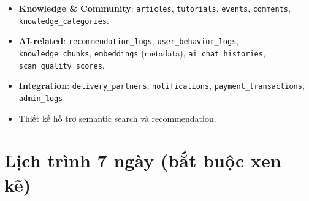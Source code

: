\documentclass[12pt,a4paper]{article}
\begin{document}
\begin{itemize}[leftmargin=*]
    \item \textbf{Knowledge \& Community}: \texttt{articles}, \texttt{tutorials}, \texttt{events}, \texttt{comments}, \texttt{knowledge\_categories}.
    \item \textbf{AI-related}: \texttt{recommendation\_logs}, \texttt{user\_behavior\_logs}, \texttt{knowledge\_chunks}, \texttt{embeddings} (metadata), \texttt{ai\_chat\_histories}, \texttt{scan\_quality\_scores}.
    \item \textbf{Integration}: \texttt{delivery\_partners}, \texttt{notifications}, \texttt{payment\_transactions}, \texttt{admin\_logs}.
    \item Thiết kế hỗ trợ semantic search và recommendation.
\end{itemize}

\vspace{10pt}

\section{Lịch trình 7 ngày (bắt buộc xen kẽ)}
\end{document}
